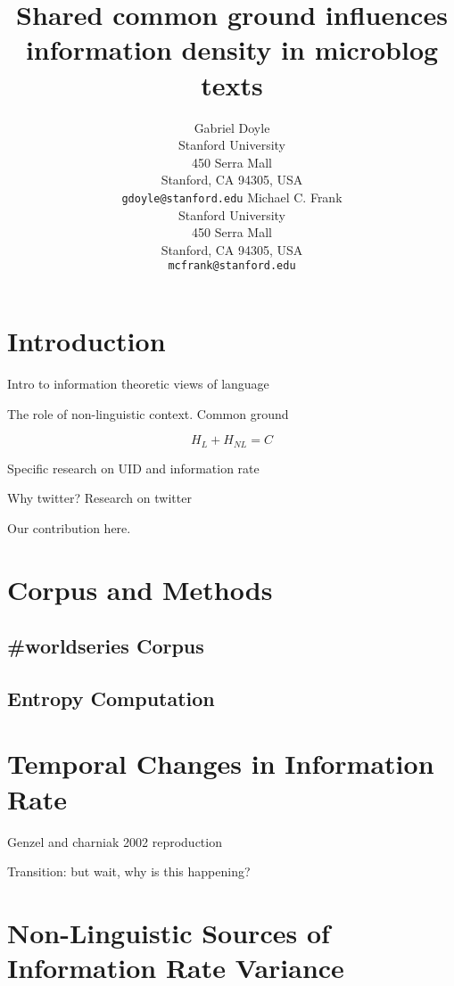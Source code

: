 \documentclass[11pt,letterpaper]{article}
\title{Shared common ground influences information density in microblog texts\Thanks{Thanks to...}}
\author{Gabriel Doyle\\
	    Stanford University\\
	    450 Serra Mall\\
	    Stanford, CA 94305, USA\\
	    {\tt gdoyle@stanford.edu}
	  \And
          Michael C. Frank\\
	    Stanford University\\
	    450 Serra Mall\\
	    Stanford, CA 94305, USA\\
	    {\tt mcfrank@stanford.edu}}
\date{}
\begin{document}
\maketitle
\begin{abstract}


\end{abstract}

\section{Introduction}

Intro to information theoretic views of language \cite{genzel2002}

The role of non-linguistic context. Common ground \cite{clark1996} \cite{brennan1990}

\begin{equation}
H_L+ H_{NL} = C
\end{equation}

Specific research on UID and information rate \cite{qian2012} \cite{levy2007}

Why twitter? Research on twitter

Our contribution here. 



\section{Corpus and Methods}

\subsection{\#worldseries Corpus}

\subsection{Entropy Computation}

\section{Temporal Changes in Information Rate}

Genzel and charniak 2002 reproduction

Transition: but wait, why is this happening?

\section{Non-Linguistic Sources of Information Rate Variance}
\end{document}
